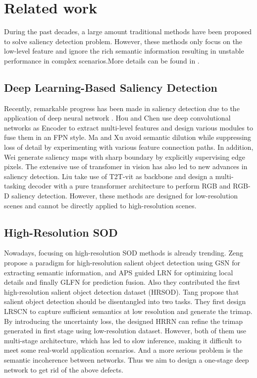 \documentclass[10pt,twocolumn,letterpaper]{article}
\begin{document}
\label{sec:intro}



\section{Related work}
During the past decades, a large amount traditional methods have been proposed to  solve saliency detection problem\cite{yan2013hierarchical,itti1998model,yang2013saliency}.  However, these methods only focus on the low-level feature and ignore the rich semantic information resulting in unstable performance in complex scenarios.More details can be found in \cite{borji2019salient}.
\subsection{Deep Learning-Based Saliency Detection}
Recently, remarkable progress has been made in saliency detection due to the application of deep neural network \cite{ zhao2019egnet, wei2020label, lin2017feature,xia2017and, xu2021locate}. Hou \etal \cite{hou2017deeply} and Chen \etal \cite{chen2020global} use deep convolutional networks as Encoder to extract multi-level features and design various modules to fuse them in an FPN style. Ma \etal \cite{ma2021pyramidal} and Xu \etal \cite{xu2021locate} avoid semantic dilution while suppressing loss of detail by experimenting with various feature connection paths. In addition, Wei \etal \cite{wei2020label} generate saliency maps with sharp boundary by explicitly supervising edge pixels. The extensive use of transfomer in vision has also led to new advances in saliency detection. Liu \etal \cite{liu2021visual} take use of T2T-vit as 
backbone and design a multi-tasking decoder with a pure transformer architecture to perform RGB and RGB-D saliency detection. However, these methods are designed for low-resolution scenes and cannot be directly applied to high-resolution scenes.




\subsection{High-Resolution SOD}
Nowadays, focusing on high-resolution SOD methods is already trending.
Zeng \etal \cite{zeng2019towards} propose a paradigm for high-resolution salient object detection using GSN for extracting semantic information, and APS guided LRN for optimizing local details and finally GLFN for prediction fusion. Also they contributed the first high-resolution salient object detection dataset (HRSOD). Tang \etal \cite{tang2021disentangled} propose that salient object detection should be disentangled into two tasks. They first design LRSCN to capture sufficient semantics at low resolution and generate the trimap. By introducing the uncertainty loss, the designed HRRN can refine the trimap generated in first stage using low-resolution dataset. However, both of them use multi-stage architecture, which has led to slow inference, making it difficult to meet some real-world application scenarios. And a more serious problem is the semantic incoherence between networks. Thus we aim to design a one-stage deep network to get rid of the above defects.
\end{document}
